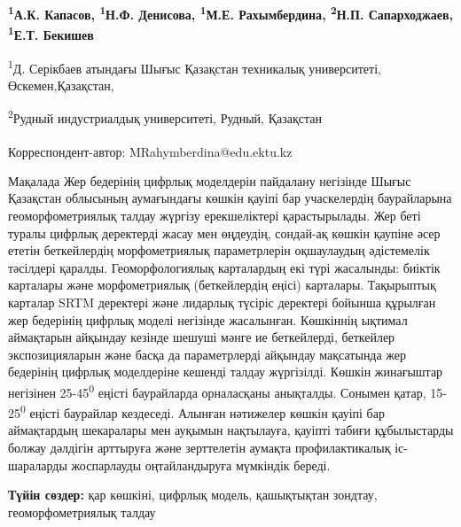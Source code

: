 
\begin{articleheader}

{\bfseries
\textsuperscript{1}А.К. Капасов,
\textsuperscript{1}Н.Ф. Денисова,
\textsuperscript{1}М.Е. Рахымбердина\textsuperscript{\envelope },
\textsuperscript{2}Н.П. Сапарходжаев,
\textsuperscript{1}Е.Т. Бекишев
}
\end{articleheader}


\begin{affiliation}
\textsuperscript{1}Д. Серікбаев атындағы Шығыс Қазақстан техникалық университеті, Өскемен,Қазақстан,

\textsuperscript{2}Рудный индустриалдық университеті, Рудный, Қазақстан

\raggedright \textsuperscript{\envelope }Корреспондент-автор: MRahymberdina@edu.ektu.kz
\end{affiliation}

Мақалада Жер бедерінің цифрлық моделдерін пайдалану негізінде Шығыс
Қазақстан облысының аумағындағы көшкін қауіпі бар учаскелердің
баурайларына геоморфометриялық талдау жүргізу ерекшеліктері
қарастырылады. Жер беті туралы цифрлық деректерді жасау мен өңдеудің,
сондай-ақ көшкін қаупіне әсер ететін беткейлердің морфометриялық
параметрлерін оқшаулаудың әдістемелік тәсілдері қаралды.
Геоморфологиялық карталардың екі түрі жасалынды: биіктік карталары және
морфометриялық (беткейлердің еңісі) карталары. Тақырыптық карталар SRTM
деректері және лидарлық түсіріс деректері бойынша құрылған жер бедерінің
цифрлық моделі негізінде жасалынған. Көшкіннің ықтимал аймақтарын
айқындау кезінде шешуші мәнге ие беткейлерді, беткейлер экспозицияларын
және басқа да параметрлерді айқындау мақсатында жер бедерінің цифрлық
моделдеріне кешенді талдау жүргізілді. Көшкін жинағыштар негізінен
25-45\textsuperscript{0} еңісті баурайларда орналасқаны анықталды.
Сонымен қатар, 15-25\textsuperscript{0} еңісті баурайлар кездеседі.
Алынған нәтижелер көшкін қауіпі бар аймақтардың шекаралары мен ауқымын
нақтылауға, қауіпті табиғи құбылыстарды болжау дәлдігін арттыруға және
зерттелетін аумақта профилактикалық іс-шараларды жоспарлауды
оңтайландыруға мүмкіндік береді.

{\bfseries Түйін сөздер:} қар көшкіні, цифрлық модель, қашықтықтан зондтау,
геоморфометриялық талдау

